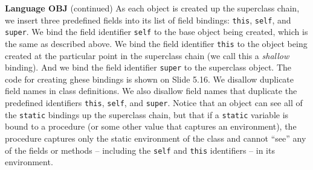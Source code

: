 \begin{minipage}[t]{\sw}
\slidenumber
\LARGE
{\bf Language OBJ} (continued)\exx
As each object is created up the superclass chain,
we insert three predefined fields
into its list of field bindings:
\verb'this', \verb'self', and \verb'super'.
We bind the field identifier \verb'self'
to the base object being created,
which is the same as described above.
We bind the field identifier \verb'this'
to the object being created at the particular point
in the superclass chain (we call this a {\em shallow} binding).
And we bind the field identifier \verb'super'
to the superclass object.
The code for creating ghese bindings is shown on Slide 5.16.\exx
We disallow duplicate field names in class definitions.
We also disallow field names that duplicate the predefined identifiers
\verb'this', \verb'self', and \verb'super'.\exx
Notice that an object can see all
of the \verb'static' bindings up the superclass chain,
but that if a \verb'static' variable is bound to a procedure
(or some other value that captures an environment),
the procedure captures only the static environment of the class
and cannot ``see'' any of the fields or methods --
including the \verb'self' and \verb'this' identifiers --
in its environment.
\end{minipage}

